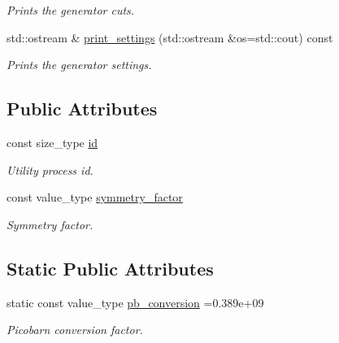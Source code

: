 \begin{DoxyCompactItemize}
\begin{DoxyCompactList}\small\item\em Prints the generator cuts. \end{DoxyCompactList}\item 
\hypertarget{a00436_a609afaf01cf286a14aaf558a6517ec39}{}std\+::ostream \& \hyperlink{a00436_a609afaf01cf286a14aaf558a6517ec39}{print\+\_\+settings} (std\+::ostream \&os=std\+::cout) const \label{a00436_a609afaf01cf286a14aaf558a6517ec39}

\begin{DoxyCompactList}\small\item\em Prints the generator settings. \end{DoxyCompactList}\end{DoxyCompactItemize}
\subsection*{Public Attributes}
\begin{DoxyCompactItemize}
\item 
\hypertarget{a00436_acae85c36c314e989b9a59c1366673a31}{}const size\+\_\+type \hyperlink{a00436_acae85c36c314e989b9a59c1366673a31}{id}\label{a00436_acae85c36c314e989b9a59c1366673a31}

\begin{DoxyCompactList}\small\item\em Utility process id. \end{DoxyCompactList}\item 
\hypertarget{a00436_a0d1ad7bb4f81fe4fcde182e0073e042c}{}const value\+\_\+type \hyperlink{a00436_a0d1ad7bb4f81fe4fcde182e0073e042c}{symmetry\+\_\+factor}\label{a00436_a0d1ad7bb4f81fe4fcde182e0073e042c}

\begin{DoxyCompactList}\small\item\em Symmetry factor. \end{DoxyCompactList}\end{DoxyCompactItemize}
\subsection*{Static Public Attributes}
\begin{DoxyCompactItemize}
\item 
\hypertarget{a00436_ab15fa12a765dc3c2d5034a09793c2f71}{}static const value\+\_\+type \hyperlink{a00436_ab15fa12a765dc3c2d5034a09793c2f71}{pb\+\_\+conversion} =0.\+389e+09\label{a00436_ab15fa12a765dc3c2d5034a09793c2f71}

\begin{DoxyCompactList}\small\item\em Picobarn conversion factor. \end{DoxyCompactList}\end{DoxyCompactItemize}
